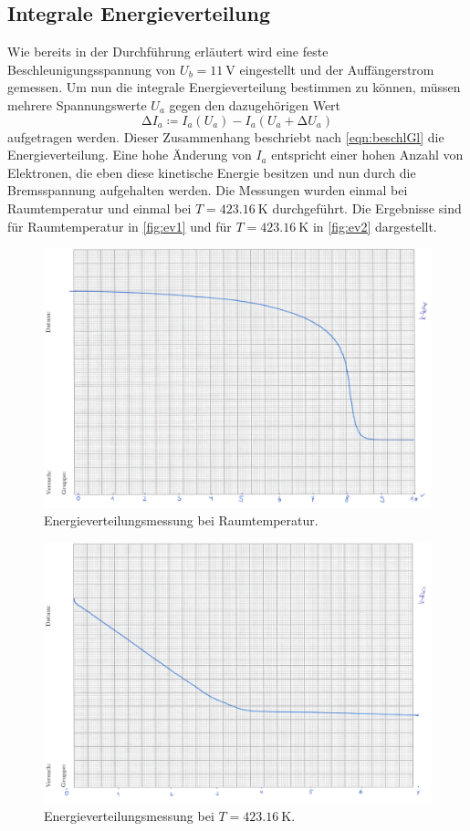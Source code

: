 \subsection{Integrale Energieverteilung}
\label{sec:ie}
Wie bereits in der Durchführung erläutert wird eine feste Beschleunigungsspannung von $U_b = \SI{11}{\volt}$ eingestellt und der Auffängerstrom gemessen.
Um nun die integrale Energieverteilung bestimmen zu können, müssen mehrere Spannungswerte $U_a$ gegen den dazugehörigen Wert
\begin{equation}
  \increment I_a \coloneq I_a(U_a) - I_a(U_a + \increment U_a)
\end{equation}
aufgetragen werden.
Dieser Zusammenhang beschriebt nach \autoref{eqn:beschlGl} die Energieverteilung. Eine hohe Änderung von $I_a$ entspricht einer hohen Anzahl von Elektronen,
die eben diese kinetische Energie besitzen und nun durch die Bremsspannung aufgehalten werden.
\newline
Die Messungen wurden einmal bei Raumtemperatur und einmal bei $T = \SI{423,16}{\kelvin}$ durchgeführt. Die Ergebnisse sind für Raumtemperatur in \autoref{fig:ev1} und für
$T = \SI{423,16}{\kelvin}$ in \autoref{fig:ev2} dargestellt.

\begin{figure}[H]
	\centering
	\includegraphics[width=0.7\linewidth]{data/EnergieverteilungRT.png}
	\caption{Energieverteilungsmessung bei Raumtemperatur.}
	\label{fig:ev1}
\end{figure}

\begin{figure}[H]
	\centering
	\includegraphics[width=0.7\linewidth]{data/Energieverteilung150C.png}
	\caption{Energieverteilungsmessung bei $T = \SI{423,16}{\kelvin}$.}
	\label{fig:ev2}
\end{figure}

